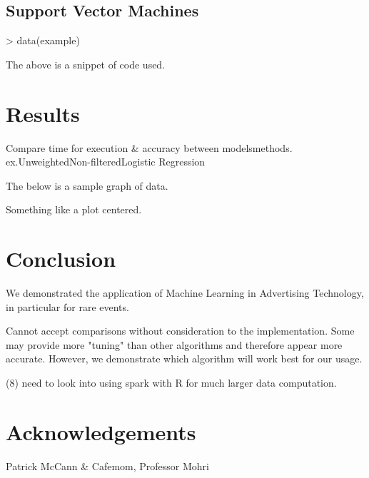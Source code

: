 \documentclass[a4paper]{article}
\begin{document}
\begin{multicols}{2}
\subsection*{Support Vector Machines}

\begin{Schunk}
\begin{Sinput}
> data(example)
\end{Sinput}
\end{Schunk}
The above is a snippet of code used. 

\section*{Results}
Compare time for execution \& accuracy between models\/methods. ex.Unweighted\/Non-filtered\/Logistic Regression

The below is a sample graph of data.
\begin{center}
Something like a plot centered.
\end{center}

\section*{Conclusion}
We demonstrated the application of Machine Learning in Advertising Technology, in particular for rare events.

Cannot accept comparisons without consideration to the implementation. Some may provide more "tuning" than other algorithms and therefore appear more accurate. However, we demonstrate which algorithm will work best for our usage.

(8) need to look into using spark with R for much larger data computation.

\section*{Acknowledgements}
Patrick McCann \& Cafemom, Professor Mohri

\end{multicols}
\end{document}
